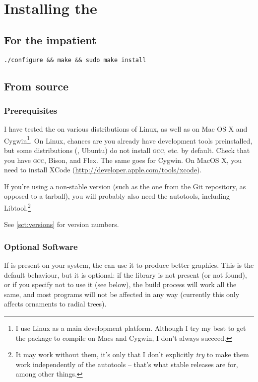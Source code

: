 \chapter{Installing the \nutils}
\label{app:installing}

\section{For the impatient}

\verb+./configure && make && sudo make install+

\section{From source}

\subsection{Prerequisites}

I have tested the \nutils{} on various distributions of Linux, as well as on Mac
OS X and Cygwin\footnote{I use Linux as a main development platform.  Although I
try my best to get the package to compile on Macs and Cygwin, I don't always
succeed.}. On Linux, chances are you already have development tools
preinstalled, but some distributions (\eg, Ubuntu) do not install \textsc{gcc},
etc. by default. Check that you have \textsc{gcc}, Bison, and Flex. The same
goes for Cygwin. On MacOS X, you need to install XCode
(\url{http://developer.apple.com/tools/xcode}).

If you're using a non-stable version (such as the one from the Git repository,
as opposed to a tarball), you will probably also need the \gnu{} autotools,
including Libtool.\footnote{It may work without them, it's only that I don't
explicitly \emph{try} to make them work independently of the autotools -- that's
what stable releases are for, among other things.}

See \ref{sct:versions} for version numbers.

\subsection{Optional Software}
\label{sct:optional}

\noindent{}If \libxml{} is present on your system, the \nutils{} can use it to
produce better \svg{} graphics. This is the default behaviour, but it is
optional: if the library is not present (or not found), or if you specify not to
use it (see below), the build process will work all the same, and most programs
will not be affected in any way (currently this only affects ornaments to
radial \svg{} trees).

